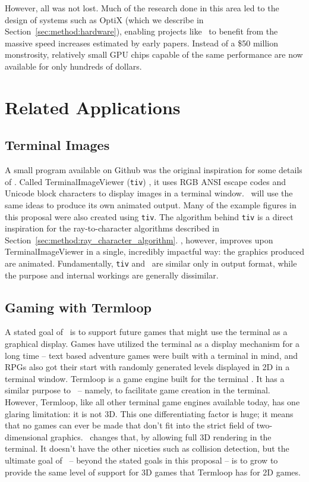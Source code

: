 However, all was not lost.
Much of the research done in this area led to the design of systems such as OptiX \cite{parker2010optix} (which we describe in Section~\ref{sec:method:hardware}), enabling projects like \name\ to benefit from the massive speed increases estimated by early papers.
Instead of a \$50 million monstrosity, relatively small GPU chips capable of the same performance are now available for only hundreds of dollars.

\section{Related Applications}

\subsection{Terminal Images}

A small program available on Github was the original inspiration for some details of \name.
Called TerminalImageViewer (\texttt{tiv}) \cite{tivGithub}, it uses RGB ANSI escape codes and Unicode block characters to display images in a terminal window.
\name\ will use the same ideas to produce its own animated output.
Many of the example figures in this proposal were also created using \texttt{tiv}.
The algorithm behind \texttt{tiv} is a direct inspiration for the ray-to-character algorithms described in Section~\ref{sec:method:ray_character_algorithm}.
\name, however, improves upon TerminalImageViewer in a single, incredibly impactful way: the graphics produced are animated.
Fundamentally, \texttt{tiv} and \name\ are similar only in output format, while the purpose and internal workings are generally dissimilar.

\subsection{Gaming with Termloop}

A stated goal of \name\ is to support future games that might use the terminal as a graphical display.
Games have utilized the terminal as a display mechanism for a long time -- text based adventure games were built with a terminal in mind, and RPGs also got their start with randomly generated levels displayed in 2D in a terminal window.
Termloop is a game engine built for the terminal \cite{termloop}.
It has a similar purpose to \name\ -- namely, to facilitate game creation in the terminal.
However, Termloop, like all other terminal game engines available today, has one glaring limitation: it is not 3D.
This one differentiating factor is huge; it means that no games can ever be made that don't fit into the strict field of two-dimensional graphics.
\name\ changes that, by allowing full 3D rendering in the terminal.
It doesn't have the other niceties such as collision detection, but the ultimate goal of \name\ -- beyond the stated goals in this proposal -- is to grow to provide the same level of support for 3D games that Termloop has for 2D games.
